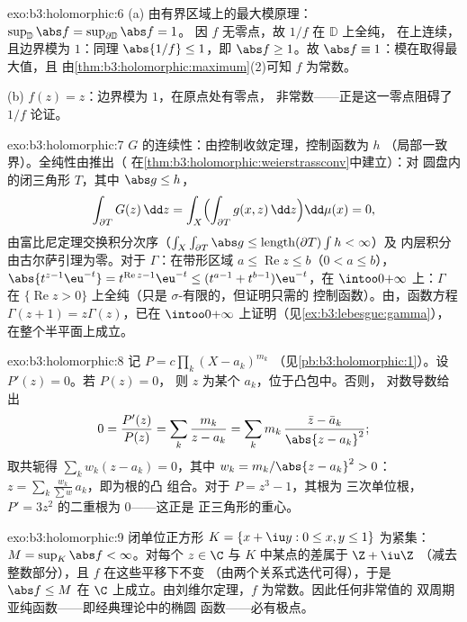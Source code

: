 \begin{solution}{exo:b3:holomorphic:6}
(a) 由有界区域上的最大模原理：
$\sup_{\mathbb D}\abs f = \sup_{\partial\mathbb D}\abs f = 1$。
因 $f$ 无零点，故 $1/f$ 在 $\mathbb D$ 上全纯，
在上连续，且边界模为 $1$：同理
$\abs{1/f} \leq 1$，即 $\abs f \geq 1$。故 $\abs f \equiv
1$：模在取得最大值，且
由\cref{thm:b3:holomorphic:maximum}(2)可知 $f$ 为常数。

(b) $f(z) = z$：边界模为 $1$，在原点处有零点，
非常数——正是这一零点阻碍了 $1/f$
论证。
\end{solution}

\begin{solution}{exo:b3:holomorphic:7}
$G$ 的连续性：由控制收敛定理，控制函数为 $h$
（局部一致界）。全纯性由推出（
在\cref{thm:b3:holomorphic:weierstrassconv}中建立）：对
圆盘内的闭三角形 $T$，其中 $\abs g \leq h$，
\[
\int_{\partial T}G(z)\,\dd z =
\int_X\Bigl(\int_{\partial T}g(x, z)\,\dd z\Bigr)\dd\mu(x) =
0,
\]
由富比尼定理交换积分次序（$\int_X\int_{\partial T}\abs
g \leq \operatorname{length}(\partial T)\int h < \infty$）及
内层积分由古尔萨引理为零。对于 $\Gamma$：在带形区域 $a
\leq \operatorname{Re}z \leq b$（$0 < a \leq b$），
$\abs{t^{z-1}\eu^{-t}} = t^{\operatorname{Re}z-1}\eu^{-t} \leq
(t^{a-1} + t^{b-1})\eu^{-t}$，在
$\intoo0{+\infty}$ 上：$\Gamma$ 在
$\{\operatorname{Re} z > 0\}$ 上全纯（只是
$\sigma$-有限的，但证明只需的
控制函数）。由，函数方程
$\Gamma(z + 1) = z\Gamma(z)$，已在
$\intoo0{+\infty}$ 上证明（见\cref{ex:b3:lebesgue:gamma}），
在整个半平面上成立。
\end{solution}

\begin{solution}{exo:b3:holomorphic:8}
记 $P = c\prod_k(X - a_k)^{m_k}$
（见\cref{pb:b3:holomorphic:1}）。设 $P'(z) = 0$。若 $P(z) = 0$，
则 $z$ 为某个 $a_k$，位于凸包中。否则，
对数导数给出
\[
0 = \frac{P'(z)}{P(z)} = \sum_k\frac{m_k}{z - a_k}
= \sum_k m_k\,\frac{\bar z - \bar a_k}{\abs{z - a_k}^2} ;
\]
取共轭得 $\sum_kw_k(z - a_k) = 0$，其中 $w_k = m_k/\abs{z -
a_k}^2 > 0$：$z = \sum_k\frac{w_k}{\sum w}\,a_k$，即为根的凸
组合。对于 $P = z^3 - 1$，其根为
三次单位根，$P' = 3z^2$ 的二重根为 $0$——这正是
正三角形的重心。
\end{solution}

\begin{solution}{exo:b3:holomorphic:9}
闭单位正方形 $K = \{x + \iu y : 0 \leq x, y \leq
1\}$ 为紧集：$M = \sup_K\abs f < \infty$。对每个 $z \in \C$
与 $K$ 中某点的差属于 $\Z + \iu\Z$
（减去整数部分），且 $f$ 在这些平移下不变
（由两个关系式迭代可得），于是 $\abs f \leq M$ 在
$\C$ 上成立。由刘维尔定理，$f$ 为常数。因此任何非常值的
双周期亚纯函数——即经典理论中的椭圆
函数——必有极点。
\end{solution}

